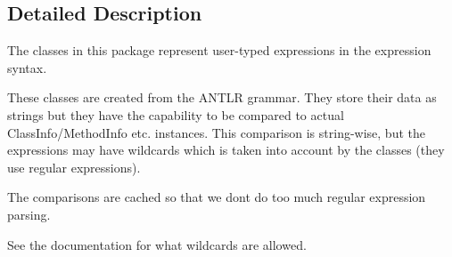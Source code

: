 \subsection{Detailed Description}
The classes in this package represent user-\/typed expressions in the expression syntax. 

These classes are created from the A\+N\+T\+LR grammar. They store their data as strings but they have the capability to be compared to actual Class\+Info/\+Method\+Info etc. instances. This comparison is string-\/wise, but the expressions may have wildcards which is taken into account by the classes (they use regular expressions).

The comparisons are cached so that we don\textquotesingle{}t do too much regular expression parsing.

See the documentation for what wildcards are allowed. 